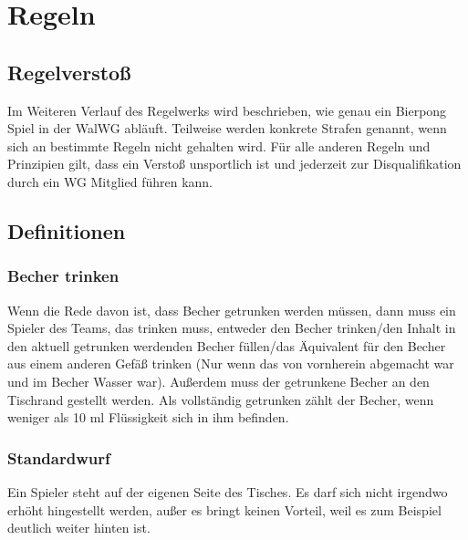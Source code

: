 \documentclass[a5paper, 12pt]{book}
\begin{document}
\tableofcontents
\cleardoublepage
{}
\part {Regeln}
\chapter*{Regelverstoß}
Im Weiteren Verlauf des Regelwerks wird beschrieben, wie genau ein Bierpong Spiel in der WalWG abläuft. Teilweise werden konkrete Strafen genannt, wenn sich an bestimmte Regeln nicht gehalten wird. Für alle anderen Regeln und Prinzipien gilt, dass ein Verstoß unsportlich ist und jederzeit zur Disqualifikation durch ein WG Mitglied führen kann. 

\chapter{Definitionen}
\section{Becher trinken} \label{bechertrinken}
Wenn die Rede davon ist, dass Becher getrunken werden müssen, dann muss ein Spieler des Teams, das trinken muss, entweder den Becher trinken/den Inhalt in den aktuell getrunken werdenden Becher füllen/das Äquivalent für den Becher aus einem anderen Gefäß trinken (Nur wenn das von vornherein abgemacht war und im Becher Wasser war). Außerdem muss der getrunkene Becher an den Tischrand gestellt werden. Als vollständig getrunken zählt der Becher, wenn weniger als 10 ml Flüssigkeit sich in ihm befinden.
\section{Standardwurf}\label{standardwurf}
Ein Spieler steht auf der eigenen Seite des Tisches. Es darf sich nicht irgendwo erhöht hingestellt werden, außer es bringt keinen Vorteil, weil es zum Beispiel deutlich weiter hinten ist. 
\end{document}
